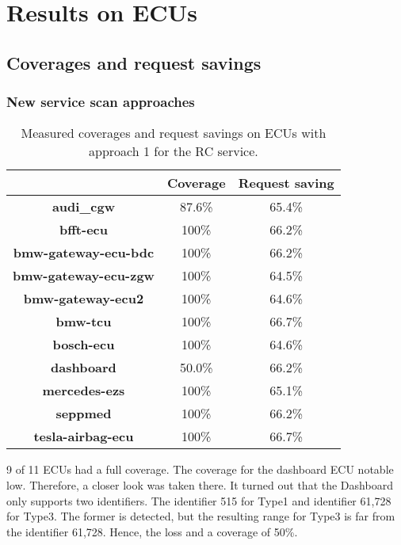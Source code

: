\section{Results on ECUs}

\subsection{Coverages and request savings}

\subsubsection{New service scan approaches}


\begin{table}[h]
    \begin{center}
    \begin{tabular}{ccc}
        \hline
        & \textbf{Coverage} & \textbf{Request saving} \\
        \hline
        \textbf{audi\_cgw} & 87.6\% & 65.4\% \\
        \textbf{bfft-ecu} & 100\% & 66.2\% \\
        \textbf{bmw-gateway-ecu-bdc} & 100\% & 66.2\% \\
        \textbf{bmw-gateway-ecu-zgw} & 100\% & 64.5\% \\
        \textbf{bmw-gateway-ecu2} & 100\% & 64.6\% \\
        \textbf{bmw-tcu} & 100\% & 66.7\% \\
        \textbf{bosch-ecu} & 100\% & 64.6\% \\
        \textbf{dashboard} & 50.0\% & 66.2\% \\
        \textbf{mercedes-ezs} & 100\% & 65.1\% \\
        \textbf{seppmed} & 100\% & 66.2\% \\
        \textbf{tesla-airbag-ecu} & 100\% & 66.7\% \\
        \hline

    \end{tabular}
    \end{center}
    \caption{Measured coverages and request savings on ECUs with approach 1 for the RC service.}
    \label{tab:evaluation-approach1}
\end{table}

9 of 11 ECUs had a full coverage. The coverage for the dashboard ECU notable low. Therefore, a closer look was taken there. It turned out that the Dashboard only supports two identifiers. The identifier 515 for Type1 and identifier 61,728 for Type3. The former is detected, but the resulting range for Type3 is far from the identifier 61,728. Hence, the loss and a coverage of 50\%.

